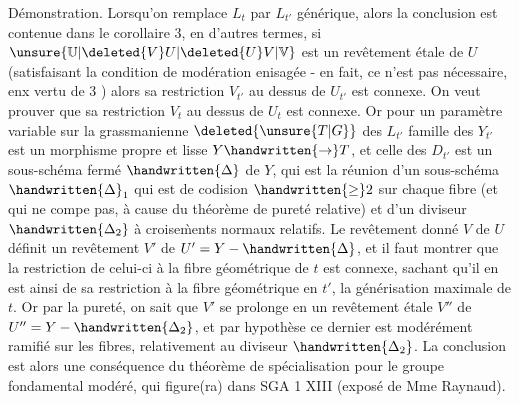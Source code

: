 Démonstration. Lorsqu'on remplace $L_t$ par $L_{t'}$ générique, alors la conclusion est contenue dans le corollaire 3, en d'autres termes, si $\unsure{\mathbb{U}|\deleted{V}U|\deleted{U}V|\mathbb{V}}$ est un revêtement étale  de $U$  (satisfaisant la condition de modération enisagée - en fait, ce n'est pas nécessaire, enx vertu de 3 ) alors sa restriction $V_{t'}$ au dessus de $U_{t'}$ est connexe. On veut prouver que sa restriction $V_t$ au dessus de $U_t$ est  connexe. Or pour un paramètre variable sur  la grassmanienne $\deleted{\unsure{T|G}}$ des $L_{t'}$\handwritten{,}   famille des $Y_{t'}$ est un morphisme propre et lisse $Y\handwritten{\rightarrow}T$, et celle des $D_{t'}$ est un sous-schéma fermé  $\handwritten{\Delta}$ de $Y$, qui est la réunion d'un sous-schéma $\handwritten{\Delta}_1$ qui est de codision $\handwritten{\geq}2$ sur chaque fibre (et qui ne compe pas, à cause du théorème de pureté relative) et d'un diviseur $\handwritten{\Delta_2}$ à croise\`{m}ents normaux relatifs. Le revêtement donné $V$ de $U$ définit un revêtement  $V'$ de $U'=Y-\handwritten{\Delta}$, et il faut montrer que la restriction de celui-ci à la fibre géométrique de $t$ est connexe, sachant qu'il en est ainsi de sa restriction à la fibre géométrique en $t'$, la générisation maximale de $t$. Or par la pureté, on sait que $V'$ se prolonge en un revêtement étale $V''$ de $U''=Y-\handwritten{\Delta_2}$, et par hypothèse ce dernier est modérément ramifié sur les fibres, relativement au diviseur $\handwritten{\Delta_2}$. La conclusion est alors une conséquence du théorème  de spécialisation pour le groupe fondamental modéré, qui figure(ra) dans SGA 1 XIII (exposé de Mme Raynaud).


